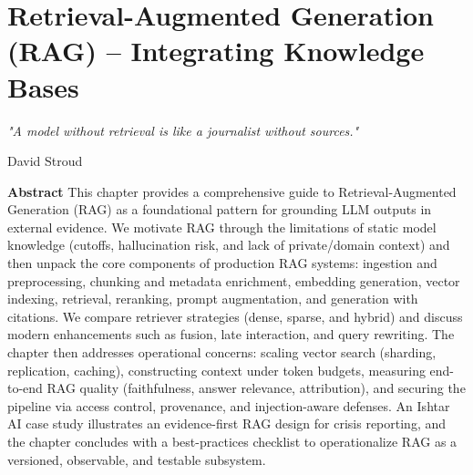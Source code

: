 \chapter{Retrieval-Augmented Generation (RAG) – Integrating Knowledge Bases}
\label{ch:rag}
\newrefsegment
{}


\epigraph{\emph{"A model without retrieval is like a journalist without sources."}}{David Stroud}

\textbf{Abstract} This chapter provides a comprehensive guide to Retrieval-Augmented Generation (RAG) as a foundational pattern for grounding LLM outputs in external evidence. We motivate RAG through the limitations of static model knowledge (cutoffs, hallucination risk, and lack of private/domain context) and then unpack the core components of production RAG systems: ingestion and preprocessing, chunking and metadata enrichment, embedding generation, vector indexing, retrieval, reranking, prompt augmentation, and generation with citations. We compare retriever strategies (dense, sparse, and hybrid) and discuss modern enhancements such as fusion, late interaction, and query rewriting. The chapter then addresses operational concerns: scaling vector search (sharding, replication, caching), constructing context under token budgets, measuring end-to-end RAG quality (faithfulness, answer relevance, attribution), and securing the pipeline via access control, provenance, and injection-aware defenses. An Ishtar AI case study illustrates an evidence-first RAG design for crisis reporting, and the chapter concludes with a best-practices checklist to operationalize RAG as a versioned, observable, and testable subsystem.

